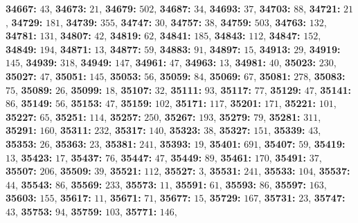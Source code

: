 \textsf{\bfseries 34667:} $43$, \textsf{\bfseries 34673:} $21$, \textsf{\bfseries 34679:} $502$, \textsf{\bfseries 34687:} $34$, \textsf{\bfseries 34693:} $37$, \textsf{\bfseries 34703:} $88$, \textsf{\bfseries 34721:} $21$, \textsf{\bfseries 34729:} $181$, \textsf{\bfseries 34739:} $355$, \textsf{\bfseries 34747:} $30$, \textsf{\bfseries 34757:} $38$, \textsf{\bfseries 34759:} $503$, \textsf{\bfseries 34763:} $132$, \textsf{\bfseries 34781:} $131$, \textsf{\bfseries 34807:} $42$, \textsf{\bfseries 34819:} $62$, \textsf{\bfseries 34841:} $185$, \textsf{\bfseries 34843:} $112$, \textsf{\bfseries 34847:} $152$, \textsf{\bfseries 34849:} $194$, \textsf{\bfseries 34871:} $13$, \textsf{\bfseries 34877:} $59$, \textsf{\bfseries 34883:} $91$, \textsf{\bfseries 34897:} $15$, \textsf{\bfseries 34913:} $29$, \textsf{\bfseries 34919:} $145$, \textsf{\bfseries 34939:} $318$, \textsf{\bfseries 34949:} $147$, \textsf{\bfseries 34961:} $47$, \textsf{\bfseries 34963:} $13$, \textsf{\bfseries 34981:} $40$, \textsf{\bfseries 35023:} $230$, \textsf{\bfseries 35027:} $47$, \textsf{\bfseries 35051:} $145$, \textsf{\bfseries 35053:} $56$, \textsf{\bfseries 35059:} $84$, \textsf{\bfseries 35069:} $67$, \textsf{\bfseries 35081:} $278$, \textsf{\bfseries 35083:} $75$, \textsf{\bfseries 35089:} $26$, \textsf{\bfseries 35099:} $18$, \textsf{\bfseries 35107:} $32$, \textsf{\bfseries 35111:} $93$, \textsf{\bfseries 35117:} $77$, \textsf{\bfseries 35129:} $47$, \textsf{\bfseries 35141:} $86$, \textsf{\bfseries 35149:} $56$, \textsf{\bfseries 35153:} $47$, \textsf{\bfseries 35159:} $102$, \textsf{\bfseries 35171:} $117$, \textsf{\bfseries 35201:} $171$, \textsf{\bfseries 35221:} $101$, \textsf{\bfseries 35227:} $65$, \textsf{\bfseries 35251:} $114$, \textsf{\bfseries 35257:} $250$, \textsf{\bfseries 35267:} $193$, \textsf{\bfseries 35279:} $79$, \textsf{\bfseries 35281:} $311$, \textsf{\bfseries 35291:} $160$, \textsf{\bfseries 35311:} $232$, \textsf{\bfseries 35317:} $140$, \textsf{\bfseries 35323:} $38$, \textsf{\bfseries 35327:} $151$, \textsf{\bfseries 35339:} $43$, \textsf{\bfseries 35353:} $26$, \textsf{\bfseries 35363:} $23$, \textsf{\bfseries 35381:} $241$, \textsf{\bfseries 35393:} $19$, \textsf{\bfseries 35401:} $691$, \textsf{\bfseries 35407:} $59$, \textsf{\bfseries 35419:} $13$, \textsf{\bfseries 35423:} $17$, \textsf{\bfseries 35437:} $76$, \textsf{\bfseries 35447:} $47$, \textsf{\bfseries 35449:} $89$, \textsf{\bfseries 35461:} $170$, \textsf{\bfseries 35491:} $37$, \textsf{\bfseries 35507:} $206$, \textsf{\bfseries 35509:} $39$, \textsf{\bfseries 35521:} $112$, \textsf{\bfseries 35527:} $3$, \textsf{\bfseries 35531:} $241$, \textsf{\bfseries 35533:} $104$, \textsf{\bfseries 35537:} $44$, \textsf{\bfseries 35543:} $86$, \textsf{\bfseries 35569:} $233$, \textsf{\bfseries 35573:} $11$, \textsf{\bfseries 35591:} $61$, \textsf{\bfseries 35593:} $86$, \textsf{\bfseries 35597:} $163$, \textsf{\bfseries 35603:} $155$, \textsf{\bfseries 35617:} $11$, \textsf{\bfseries 35671:} $71$, \textsf{\bfseries 35677:} $15$, \textsf{\bfseries 35729:} $167$, \textsf{\bfseries 35731:} $23$, \textsf{\bfseries 35747:} $43$, \textsf{\bfseries 35753:} $94$, \textsf{\bfseries 35759:} $103$, \textsf{\bfseries 35771:} $146$, 
